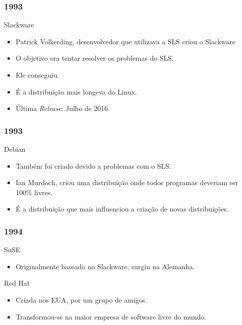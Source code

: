 \documentclass[aspectratio=169,14pt]{beamer}
\begin{document}
\begin{frame}
    \frametitle{1993}
    \begin{center}\large Slackware \end{center}
    \begin{itemize}
        \item Patrick Volkerding, desenvolvedor que utilizava
        a SLS criou o Slackware
        \item O objetivo era tentar resolver os problemas do SLS.
        \item Ele conseguiu.
        \item É a distribuição mais longeva do Linux.
        \item Última \emph{Release}: Julho de 2016.
    \end{itemize}
\end{frame}

\begin{frame}
    \frametitle{1993}
    \begin{center}\large Debian \end{center}
    \begin{itemize}
      \item Também foi criado devido a problemas com o SLS.
      \item Ian Murdoch, criou uma distribuição onde todos programas
      deveriam ser 100\% livres.
      \item É a distribuição que mais influenciou a criação de novas distribuições.
    \end{itemize}
\end{frame}

\begin{frame}
    \frametitle{1994}
    \begin{center}\large SuSE \end{center}
    \begin{itemize}
        \item Originalmente baseado no Slackware, surgiu na Alemanha.
    \end{itemize}
    \begin{center}\large Red Hat \end{center}
    \begin{itemize}
        \item Criada nos EUA, por um grupo de amigos.
        \item Transformou-se na maior empresa de software livre do mundo.
    \end{itemize}
\end{frame}
\end{document}
